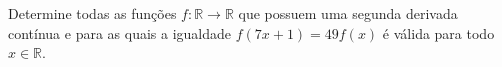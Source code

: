 Determine todas as funções \(f \colon \mathbb{R} \to \mathbb{R}\) que possuem uma segunda derivada contínua e para as quais a igualdade \(f(7x+1) = 49f(x)\) é válida para todo \(x \in \mathbb{R}\).
